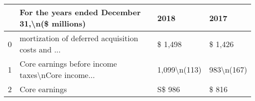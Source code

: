 \begin{tabular}{llll}
\toprule
{} &     For the years ended December 31,\textbackslash n(\$ millions) &          2018 &        2017 \\
\midrule
0 &  mortization of deferred acquisition costs and ... &       \$ 1,498 &     \$ 1,426 \\
1 &  Core earnings before income taxes\textbackslash nCore income... &  1,099\textbackslash n(113) &  983\textbackslash n(167) \\
2 &                                      Core earnings &        S\$ 986 &       \$ 816 \\
\bottomrule
\end{tabular}
